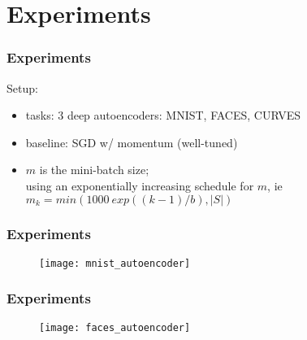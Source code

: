 \section{Experiments}

\begin{frame}
\frametitle{Experiments}
Setup:
\begin{itemize}
    \item tasks: 3 deep autoencoders: MNIST, FACES, CURVES
    \item baseline: SGD w/ momentum (well-tuned)
    \item $m$ is the mini-batch size;\\
          using an exponentially increasing schedule for $m$, ie
          $m_k = min(1000~exp((k − 1)/b), |S|)$
\end{itemize}
\end{frame}

\begin{frame}
\frametitle{Experiments}
\begin{figure}
    \centering
    \texttt{[image: mnist\_autoencoder]}
\end{figure}

\end{frame}

\begin{frame}
\frametitle{Experiments}
\begin{figure}
    \centering
    \texttt{[image: faces\_autoencoder]}
\end{figure}
\end{frame}
